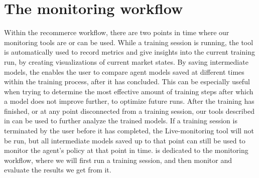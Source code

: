 
\section{The monitoring workflow}

Within the recommerce workflow, there are two points in time where our monitoring tools are or can be used. While a training session is running, the  tool is automatically used to record metrics and give insights into the current training run, by creating visualizations of current market states. By saving intermediate models, the  enables the user to compare agent models saved at different times within the training process, after it has concluded. This can be especially useful when trying to determine the most effective amount of training steps after which a model does not improve further, to optimize future runs. After the training has finished, or at any point disconnected from a training session, our tools described in  can be used to further analyze the trained models. If a training session is terminated by the user before it has completed, the Live-monitoring tool will not be run, but all intermediate models saved up to that point can still be used to monitor the agent's policy at that point in time.  is dedicated to the monitoring workflow, where we will first run a training session, and then monitor and evaluate the results we get from it.


